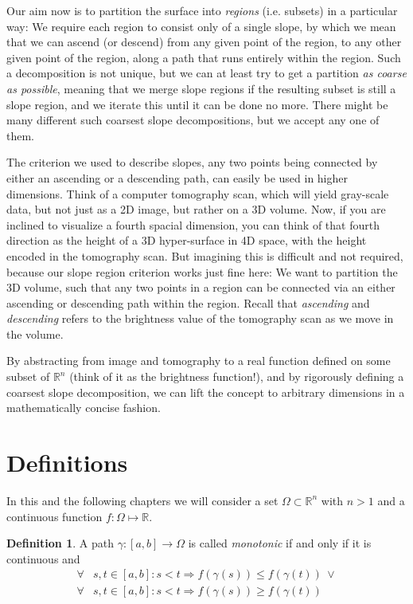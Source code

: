\documentclass[a4paper,12pt]{paper}
\theoremstyle{plain}
\theoremstyle{definition}
\newtheorem{defn}[thm]{Definition} %
\begin{document}
Our aim now is to partition the surface into \emph{regions} (i.e. subsets) in a particular way: We require each region to consist only of a single slope, by which we mean that we can ascend (or descend) from any given point of the region, to any other given point of the region, along a path that runs entirely within the region. Such a decomposition is not unique, but we can at least try to get a partition \emph{as coarse as possible}, meaning that we merge slope regions if the resulting subset is still a slope region, and we iterate this until it can be done no more. There might be many different such coarsest slope decompositions, but we accept any one of them.

The criterion we used to describe slopes, any two points being connected by either an ascending or a descending path, can easily be used in higher dimensions. Think of a computer tomography scan, which will yield gray-scale data, but not just as a 2D image, but rather on a 3D volume.
Now, if you are inclined to visualize a fourth spacial dimension, you can think of that fourth direction as the height of a 3D hyper-surface in 4D space, with the height encoded in the tomography scan. But imagining this is difficult and not required, because our slope region criterion works just fine here: We want to partition the 3D volume, such that any two points in a region can be connected via an either ascending or descending path within the region. Recall that \emph{ascending} and \emph{descending} refers to the brightness value of the tomography scan as we move in the volume.

By abstracting from image and tomography to a real function defined on some subset of $\mathbb{R}^n$ (think of it as the brightness function!), and by rigorously defining a coarsest slope decomposition, we can lift the concept to arbitrary dimensions in a mathematically concise fashion.

\section{Definitions}

In this and the following chapters we will consider a set $\Omega \subset \mathbb{R}^n$ with $n > 1$ and a continuous function $f: \Omega \mapsto \mathbb{R}$.

\begin{defn}
A path $\gamma: [a,b] \to \Omega$ is called \emph{monotonic} if and only if it is continuous and
\begin{align*}
\forall & s, t \in [a,b]: s < t \Rightarrow f(\gamma(s)) \leq f(\gamma(t)) ~ \lor \\
\forall & s, t \in [a,b]: s < t \Rightarrow f(\gamma(s)) \geq f(\gamma(t))
\end{align*}
\end{defn}
\end{document}
